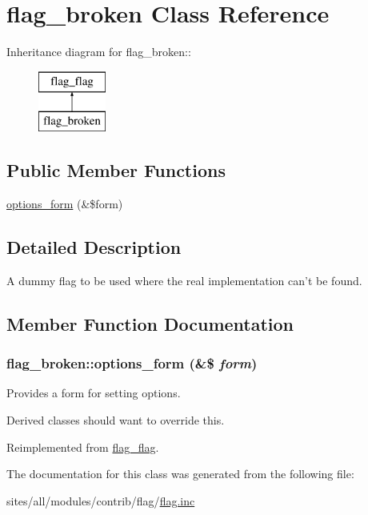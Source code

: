 \hypertarget{classflag__broken}{
\section{flag\_\-broken Class Reference}
\label{classflag__broken}
}
Inheritance diagram for flag\_\-broken::\begin{figure}[H]
\begin{center}
\leavevmode
\includegraphics[height=2cm]{classflag__broken}
\end{center}
\end{figure}
\subsection*{Public Member Functions}
\begin{CompactItemize}
\item 
\hyperlink{classflag__broken_85e471e11b2a6b3781a52ff79864ae93}{options\_\-form} (\&\$form)
\end{CompactItemize}


\subsection{Detailed Description}
A dummy flag to be used where the real implementation can't be found. 

\subsection{Member Function Documentation}
\hypertarget{classflag__broken_85e471e11b2a6b3781a52ff79864ae93}{
\subsubsection[{options\_\-form}]{\setlength{\rightskip}{0pt plus 5cm}flag\_\-broken::options\_\-form (\&\$ {\em form})}}
\label{classflag__broken_85e471e11b2a6b3781a52ff79864ae93}


Provides a form for setting options.

Derived classes should want to override this. 

Reimplemented from \hyperlink{classflag__flag_28aec91da5bc068c6c2a9a707ef62345}{flag\_\-flag}.

The documentation for this class was generated from the following file:\begin{CompactItemize}
\item 
sites/all/modules/contrib/flag/\hyperlink{flag_8inc}{flag.inc}\end{CompactItemize}
